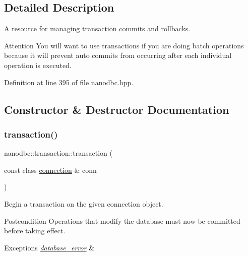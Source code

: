 \subsection{Detailed Description}
A resource for managing transaction commits and rollbacks. 

\begin{DoxyAttention}{Attention}
You will want to use transactions if you are doing batch operations because it will prevent auto commits from occurring after each individual operation is executed. 
\end{DoxyAttention}


Definition at line 395 of file nanodbc.\+hpp.



\subsection{Constructor \& Destructor Documentation}
\mbox{\label{classnanodbc_1_1transaction_a2327256b4198143da5f7c84d64834f5b}} 
\subsubsection{\texorpdfstring{transaction()}{transaction()}\hspace{0.1cm}{\footnotesize\ttfamily [1/3]}}
{\footnotesize\ttfamily nanodbc\+::transaction\+::transaction (\begin{DoxyParamCaption}\item[{const class \mbox{\hyperlink{classnanodbc_1_1connection}{connection}} \&}]{conn }\end{DoxyParamCaption})\hspace{0.3cm}{\ttfamily [explicit]}}



Begin a transaction on the given connection object. 

\begin{DoxyPostcond}{Postcondition}
Operations that modify the database must now be committed before taking effect. 
\end{DoxyPostcond}

\begin{DoxyExceptions}{Exceptions}
{\em \mbox{\hyperlink{classnanodbc_1_1database__error}{database\+\_\+error}}} & \\
\hline
\end{DoxyExceptions}


